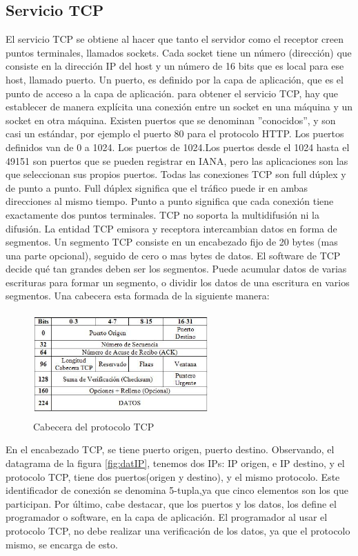 \subsection{Servicio TCP}
	El servicio TCP se obtiene al hacer que tanto el servidor como el receptor creen puntos terminales, llamados sockets. Cada socket tiene un número (dirección) que consiste en la dirección IP del host y un número de 16 bits que es local para ese host, llamado puerto. Un puerto, es definido por la capa de aplicación, que es el punto de acceso a la capa de aplicación. para obtener el servicio TCP, hay que establecer de manera explícita una conexión entre un socket en una máquina y un socket en otra máquina. 
	Existen puertos que se denominan ''conocidos'', y son casi un estándar, por ejemplo el puerto 80 para el protocolo HTTP. Los puertos definidos van de 0 a 1024. Los puertos de 1024.Los puertos desde el 1024 hasta el 49151 son puertos que se pueden registrar en IANA, pero las aplicaciones son las que seleccionan sus propios puertos.  
	Todas las conexiones TCP son full dúplex y de punto a punto. Full dúplex significa que el tráfico puede 	ir en ambas direcciones al mismo tiempo. Punto a punto significa que cada conexión tiene exactamente dos puntos terminales. TCP no soporta la multidifusión ni la difusión. 
	La entidad TCP emisora y receptora intercambian datos en forma de segmentos. Un segmento TCP consiste en un encabezado fijo de 20 bytes (mas una parte opcional), seguido de cero o mas bytes de datos. El software de TCP decide qué tan grandes deben ser los segmentos. Puede acumular datos de varias escrituras para formar un segmento, o dividir los datos de una escritura en varios segmentos. Una cabecera esta formada de la siguiente manera: 
	\begin{figure}[ht]
		\centering 
		\includegraphics[height=4cm,width=0.6\textwidth]{parte_2/redes/cabecera-tcp} 
		\caption{Cabecera del protocolo TCP}
	\end{figure}

	En el encabezado TCP, se tiene puerto origen, puerto destino. Observando, el datagrama de la figura \ref{fig:datIP}, tenemos dos IPs: IP origen, e IP destino, y el protocolo TCP, tiene dos puertos(origen y destino), y el mismo protocolo. Este identificador de conexión se denomina 5-tupla,ya que cinco elementos son los que participan. 
	Por último, cabe destacar, que los puertos y los datos, los define el programador o software, en la capa de aplicación. El programador al usar el protocolo TCP, no debe realizar una verificación de los datos, ya que el protocolo mismo, se encarga de esto. 
	
